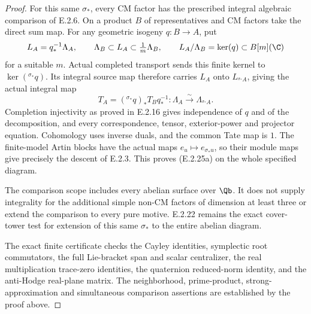 \begin{proof}
For this same \(\sigma_*\), every CM factor has
the prescribed integral algebraic comparison of
E.2.6. On a product \(B\) of representatives and
CM factors take the direct sum map. For any
geometric isogeny \(q:B\to A\), put
\[
 L_A=q_*^{-1}\Lambda_A,
 \qquad \Lambda_B\subset L_A\subset\tfrac1m\Lambda_B,
 \qquad L_A/\Lambda_B=\ker(q)\subset B[m](\C)
\]
for a suitable \(m\). Actual completed transport
sends this finite kernel to \(\ker({}^{\sigma_*}q)\).
Its integral source map therefore carries \(L_A\)
onto \(L_{{}^{\sigma_*}A}\), giving the actual
integral map
\[
 T_A=({}^{\sigma_*}q)_*T_Bq_*^{-1}:
       \Lambda_A\xrightarrow{\sim}\Lambda_{{}^{\sigma_*}A}.
\]
Completion injectivity as proved in E.2.16 gives
independence of \(q\) and of the decomposition,
and every correspondence, tensor, exterior-power
and projector equation. Cohomology uses inverse
duals, and the common Tate map is \(1\). The
finite-model Artin blocks have the actual maps
\(e_u\mapsto e_{\sigma_*u}\), so their module
maps give precisely the descent of E.2.3.
This proves (E.2.25a) on the whole specified diagram.

The comparison scope includes every abelian surface
over \(\Qb\). It does not supply integrality for
the additional simple non-CM factors of dimension
at least three or extend the comparison to every
pure motive. E.2.22 remains the exact cover-tower
test for extension of this same \(\sigma_*\) to
the entire abelian diagram.

The exact finite certificate
 checks the
Cayley identities, symplectic root commutators,
the full Lie-bracket span and scalar centralizer,
the real multiplication trace-zero identities,
the quaternion reduced-norm identity, and the
anti-Hodge real-plane matrix. The neighborhood,
prime-product, strong-approximation and simultaneous
comparison assertions are established by the proof
above.
\end{proof}

